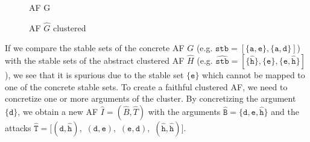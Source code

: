 \vspace{0.3cm}
\begin{figure}[h]
\begin{minipage}{.5\textwidth}
    \centering
    \caption{\ac{AF} G}
    \label{af:backgroundClusterExample1}
\end{minipage}%
\begin{minipage}{.5\textwidth}
    \centering
    \caption{\ac{AF} $\hat{G}$ clustered}
    \label{af:backgroundClusterExample2}
\end{minipage}
\end{figure}

If we compare the stable sets of the concrete AF $G$ (e.g. $\mathtt{stb=[\{a, e\}, \{a, d\}]}$) with the stable sets of the abstract clustered AF $\hat{H}$ (e.g. $\mathtt{\hat{stb}=[\{\hat{h}\}, \{e\}, \{e, \hat{h}\}]}$), we see that it is spurious due to the stable set $\mathtt{\{e\}}$ which cannot be mapped to one of the concrete stable sets. To create a faithful clustered AF, we need to concretize one or more arguments of the cluster. By concretizing the argument $\mathtt{\{d\}}$, we obtain a new AF $\hat{I}=(\hat{B}, \hat{T})$ with the arguments $\mathtt{\hat{B}=\{d, e, \hat{h}\}}$ and the attacks $\mathtt{\hat{T}=[(d, \hat{h}),}$
$\mathtt{(d, e),}$
$\mathtt{(e, d),}$
$\mathtt{(\hat{h}, \hat{h})]}.$

